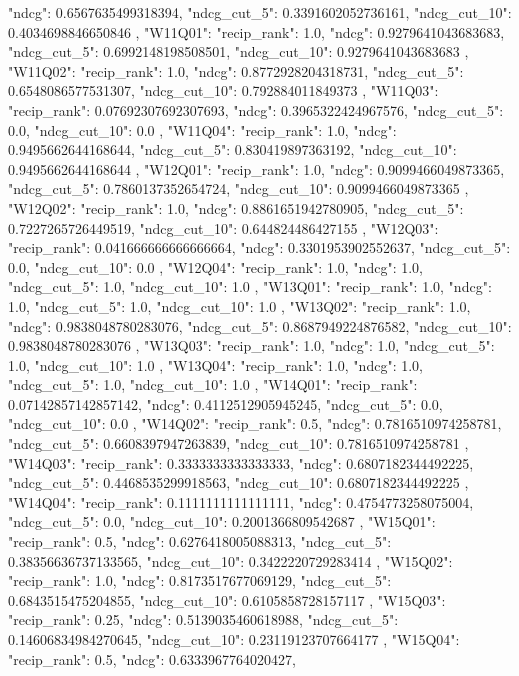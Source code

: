 {{  "ndcg": 0.6567635499318394,
  "ndcg_cut_5": 0.3391602052736161,
  "ndcg_cut_10": 0.4034698846650846
 },
 "W11Q01": {
  "recip_rank": 1.0,
  "ndcg": 0.9279641043683683,
  "ndcg_cut_5": 0.6992148198508501,
  "ndcg_cut_10": 0.9279641043683683
 },
 "W11Q02": {
  "recip_rank": 1.0,
  "ndcg": 0.8772928204318731,
  "ndcg_cut_5": 0.6548086577531307,
  "ndcg_cut_10": 0.792884011849373
 },
 "W11Q03": {
  "recip_rank": 0.07692307692307693,
  "ndcg": 0.3965322424967576,
  "ndcg_cut_5": 0.0,
  "ndcg_cut_10": 0.0
 },
 "W11Q04": {
  "recip_rank": 1.0,
  "ndcg": 0.9495662644168644,
  "ndcg_cut_5": 0.830419897363192,
  "ndcg_cut_10": 0.9495662644168644
 },
 "W12Q01": {
  "recip_rank": 1.0,
  "ndcg": 0.9099466049873365,
  "ndcg_cut_5": 0.7860137352654724,
  "ndcg_cut_10": 0.9099466049873365
 },
 "W12Q02": {
  "recip_rank": 1.0,
  "ndcg": 0.8861651942780905,
  "ndcg_cut_5": 0.7227265726449519,
  "ndcg_cut_10": 0.644824486427155
 },
 "W12Q03": {
  "recip_rank": 0.041666666666666664,
  "ndcg": 0.3301953902552637,
  "ndcg_cut_5": 0.0,
  "ndcg_cut_10": 0.0
 },
 "W12Q04": {
  "recip_rank": 1.0,
  "ndcg": 1.0,
  "ndcg_cut_5": 1.0,
  "ndcg_cut_10": 1.0
 },
 "W13Q01": {
  "recip_rank": 1.0,
  "ndcg": 1.0,
  "ndcg_cut_5": 1.0,
  "ndcg_cut_10": 1.0
 },
 "W13Q02": {
  "recip_rank": 1.0,
  "ndcg": 0.9838048780283076,
  "ndcg_cut_5": 0.8687949224876582,
  "ndcg_cut_10": 0.9838048780283076
 },
 "W13Q03": {
  "recip_rank": 1.0,
  "ndcg": 1.0,
  "ndcg_cut_5": 1.0,
  "ndcg_cut_10": 1.0
 },
 "W13Q04": {
  "recip_rank": 1.0,
  "ndcg": 1.0,
  "ndcg_cut_5": 1.0,
  "ndcg_cut_10": 1.0
 },
 "W14Q01": {
  "recip_rank": 0.07142857142857142,
  "ndcg": 0.4112512905945245,
  "ndcg_cut_5": 0.0,
  "ndcg_cut_10": 0.0
 },
 "W14Q02": {
  "recip_rank": 0.5,
  "ndcg": 0.7816510974258781,
  "ndcg_cut_5": 0.6608397947263839,
  "ndcg_cut_10": 0.7816510974258781
 },
 "W14Q03": {
  "recip_rank": 0.3333333333333333,
  "ndcg": 0.6807182344492225,
  "ndcg_cut_5": 0.4468535299918563,
  "ndcg_cut_10": 0.6807182344492225
 },
 "W14Q04": {
  "recip_rank": 0.1111111111111111,
  "ndcg": 0.4754773258075004,
  "ndcg_cut_5": 0.0,
  "ndcg_cut_10": 0.2001366809542687
 },
 "W15Q01": {
  "recip_rank": 0.5,
  "ndcg": 0.6276418005088313,
  "ndcg_cut_5": 0.38356636737133565,
  "ndcg_cut_10": 0.3422220729283414
 },
 "W15Q02": {
  "recip_rank": 1.0,
  "ndcg": 0.8173517677069129,
  "ndcg_cut_5": 0.6843515475204855,
  "ndcg_cut_10": 0.6105858728157117
 },
 "W15Q03": {
  "recip_rank": 0.25,
  "ndcg": 0.5139035460618988,
  "ndcg_cut_5": 0.14606834984270645,
  "ndcg_cut_10": 0.23119123707664177
 },
 "W15Q04": {
  "recip_rank": 0.5,
  "ndcg": 0.6333967764020427,
}}
